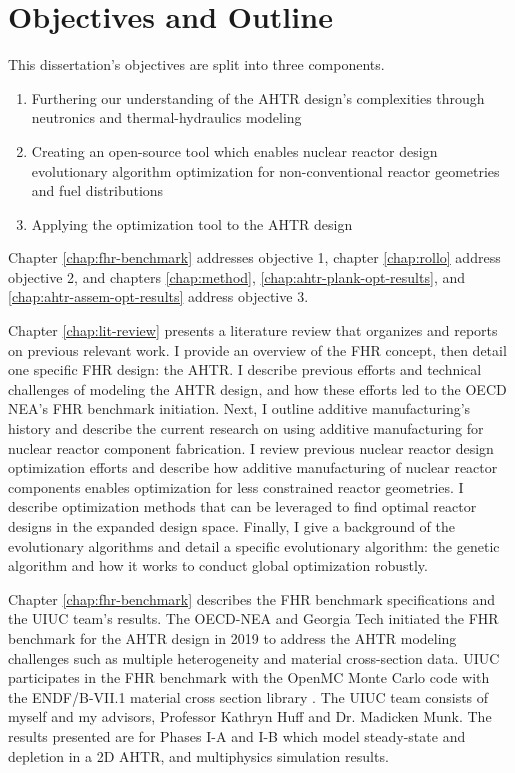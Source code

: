 \section{Objectives and Outline}
This dissertation's objectives are split into three components. 
\begin{enumerate}
    \item Furthering our understanding of the \gls{AHTR} design's complexities 
    through neutronics and thermal-hydraulics modeling 
    \item Creating an open-source tool which enables nuclear reactor design 
    evolutionary algorithm optimization for non-conventional reactor geometries and fuel 
    distributions
    \item Applying the optimization tool to the \gls{AHTR} design 
\end{enumerate}
Chapter \ref{chap:fhr-benchmark} addresses objective 1, chapter \ref{chap:rollo} 
address objective 2, and chapters \ref{chap:method}, \ref{chap:ahtr-plank-opt-results}, 
and \ref{chap:ahtr-assem-opt-results} address objective 3. 

Chapter \ref{chap:lit-review} presents a literature review that organizes and 
reports on previous relevant work. 
I provide an overview of the \gls{FHR} concept, then detail one specific 
\gls{FHR} design: the \gls{AHTR}. 
I describe previous efforts and technical challenges of modeling the \gls{AHTR} design, 
and how these efforts led to the \gls{OECD} \gls{NEA}'s \gls{FHR} benchmark initiation.
Next, I outline additive manufacturing's history and describe the current 
research on using additive manufacturing for nuclear reactor component fabrication. 
I review previous nuclear reactor design optimization efforts and describe how 
additive manufacturing of nuclear reactor components enables optimization for 
less constrained reactor geometries. 
I describe optimization methods that can be leveraged to find optimal reactor 
designs in the expanded design space.
Finally, I give a background of the evolutionary algorithms and detail a specific 
evolutionary algorithm: the genetic algorithm and how it works to conduct global 
optimization robustly.

Chapter \ref{chap:fhr-benchmark} describes the \gls{FHR} benchmark specifications and 
the \gls{UIUC} team's results.
The \gls{OECD}-\gls{NEA} and \gls{Georgia Tech} initiated the \gls{FHR} 
benchmark for the \gls{AHTR} design in 2019 \cite{petrovic_benchmark_2021} 
to address the \gls{AHTR} modeling challenges such as multiple heterogeneity and 
material cross-section data. 
\gls{UIUC} participates in the \gls{FHR} benchmark with the OpenMC Monte Carlo code 
\cite{romano_openmc_2013} with the ENDF/B-VII.1 material cross section library 
\cite{chadwick_endf/b-vii.1_2011}.
The \gls{UIUC} team consists of myself and my advisors, Professor Kathryn Huff and Dr.
Madicken Munk. 
The results presented are for Phases I-A and I-B which model steady-state and 
depletion in a 2D \gls{AHTR}, and multiphysics simulation results. 

